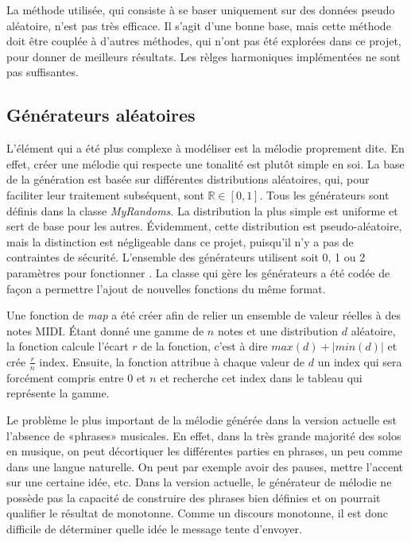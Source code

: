 \documentclass[letterpaper,12pt]{scrartcl}
\begin{document}
	La méthode utilisée, qui consiste à se baser uniquement sur des données pseudo aléatoire, n'est pas très efficace. Il s'agit d'une bonne base, mais cette méthode doit être couplée à d'autres méthodes, qui n'ont pas été explorées dans ce projet, pour donner de meilleurs résultats. Les rèlges harmoniques implémentées ne sont pas suffisantes. 

	\subsection{Générateurs aléatoires}
	L'élément qui a été plus complexe à modéliser est la mélodie proprement dite. En effet, créer une mélodie qui respecte une tonalité est plutôt simple en soi. La base de la génération est basée sur différentes distributions aléatoires, qui, pour faciliter leur traitement subséquent, sont $\mathbb{R} \in [0,1]$. Tous les générateurs sont définis dans la classe \textit{MyRandoms}. La distribution la plus simple est uniforme et sert de base pour les autres. Évidemment, cette distribution est pseudo-aléatoire, mais la distinction est négligeable dans ce projet, puisqu'il n'y a pas de contraintes de sécurité. L'ensemble des générateurs utilisent soit 0, 1 ou 2 paramètres pour fonctionner \cite{args1} \cite{args2}. La classe qui gère les générateurs a été codée de façon a permettre l'ajout de nouvelles fonctions du même format. 
	
	Une fonction de \textit{map} a été créer afin de relier un ensemble de valeur réelles à des notes MIDI. Étant donné une gamme de $n$ notes et une distribution $d$ aléatoire, la fonction calcule l'écart $r$ de la fonction, c'est à dire $max(d) + |min(d)|$ et crée $\frac{r}{n}$ index. Ensuite, la fonction attribue à chaque valeur de $d$ un index qui sera forcément compris entre 0 et $n$ et recherche cet index dans le tableau qui représente la gamme.
	
	Le problème le plus important de la mélodie générée dans la version actuelle est l'absence de «phrases» musicales. En effet, dans la très grande majorité des solos en musique, on peut décortiquer les différentes parties en phrases, un peu comme dans une langue naturelle. On peut par exemple avoir des pauses, mettre l'accent sur une certaine idée, etc. Dans la version actuelle, le générateur de mélodie ne possède pas la capacité de construire des phrases bien définies et on pourrait qualifier le résultat de monotonne. Comme un discours monotonne, il est donc difficile de déterminer quelle idée le message tente d'envoyer.
	
\end{document}
